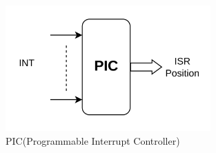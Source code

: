 \begin{figure}
    \centering
    \includegraphics[width=0.7\textwidth]{img/PIC.png}
    \caption{PIC(Programmable Interrupt Controller)}\label{img:PIC}
\end{figure}

